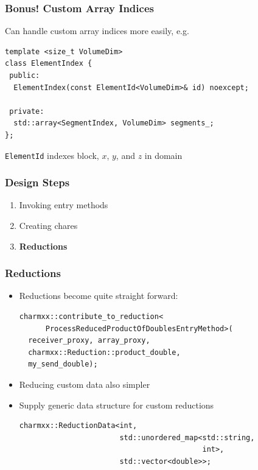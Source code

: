\documentclass[svgnames,tikz,serif,ragged2e]{beamer}
\begin{document}
\begin{frame}[fragile]
  \frametitle{Bonus! Custom Array Indices}
  Can handle custom array indices more easily, e.g.
\begin{lstlisting}
template <size_t VolumeDim>
class ElementIndex {
 public:
  ElementIndex(const ElementId<VolumeDim>& id) noexcept;

 private:
  std::array<SegmentIndex, VolumeDim> segments_;
};
\end{lstlisting}
  \texttt{ElementId} indexes block, $x$, $y$, and $z$ in domain
\end{frame}

\begin{frame}[noframenumbering]
  \frametitle{Design Steps}
  \begin{enumerate}
  \item Invoking entry methods
  \item Creating chares
  \item \textbf{Reductions}
  \end{enumerate}
\end{frame}

\begin{frame}
  \frametitle{Reductions}
  \begin{itemize}
  \item<1-> Reductions become quite straight forward:
\begin{lstlisting}
charmxx::contribute_to_reduction<
      ProcessReducedProductOfDoublesEntryMethod>(
  receiver_proxy, array_proxy,
  charmxx::Reduction::product_double,
  my_send_double);
\end{lstlisting}
  \item<2-> Reducing custom data also simpler
  \item<2-> Supply generic data structure for custom reductions
\begin{lstlisting}
charmxx::ReductionData<int,
                       std::unordered_map<std::string,
                                          int>,
                       std::vector<double>>;
\end{lstlisting}
  \end{itemize}
\end{frame}
\end{document}
